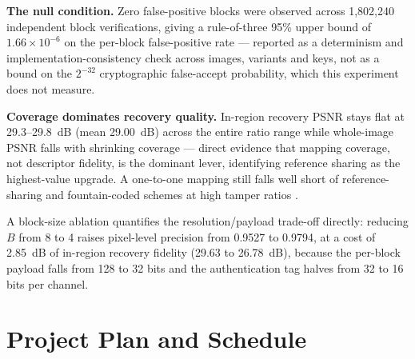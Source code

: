 \documentclass[12pt,a4paper]{article}
\begin{document}
\textbf{The null condition.} Zero false-positive blocks were observed across
1{,}802{,}240 independent block verifications, giving a rule-of-three 95\%
upper bound of $1.66\times10^{-6}$ on the per-block false-positive rate ---
reported as a determinism and implementation-consistency check across images,
variants and keys, not as a bound on the $2^{-32}$ cryptographic false-accept
probability, which this experiment does not measure.

\textbf{Coverage dominates recovery quality.} In-region recovery PSNR stays
flat at 29.3--29.8~dB (mean 29.00~dB) across the entire ratio range while
whole-image PSNR falls with shrinking coverage --- direct evidence that
mapping coverage, not descriptor fidelity, is the dominant lever, identifying
reference sharing as the highest-value upgrade. A one-to-one mapping still
falls well short of reference-sharing and fountain-coded schemes at high
tamper ratios \cite{zhang2011reference,korus2013efficient}.

A block-size ablation quantifies the resolution/payload trade-off directly:
reducing $B$ from 8 to 4 raises pixel-level precision from 0.9527 to 0.9794,
at a cost of 2.85~dB of in-region recovery fidelity (29.63 to 26.78~dB),
because the per-block payload falls from 128 to 32 bits and the
authentication tag halves from 32 to 16 bits per channel.

\section{Project Plan and Schedule}
\end{document}
